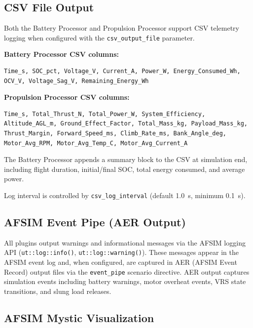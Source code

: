 \subsection{\unclass CSV File Output}

\unclass Both the Battery Processor and Propulsion Processor support CSV telemetry logging when configured with the \texttt{csv\_output\_file} parameter.

\unclass \textbf{Battery Processor CSV columns:}
\begin{codebox}
\begin{lstlisting}[language={},mathescape=false]
Time_s, SOC_pct, Voltage_V, Current_A, Power_W, Energy_Consumed_Wh,
OCV_V, Voltage_Sag_V, Remaining_Energy_Wh
\end{lstlisting}
\end{codebox}

\unclass \textbf{Propulsion Processor CSV columns:}
\begin{codebox}
\begin{lstlisting}[language={},mathescape=false]
Time_s, Total_Thrust_N, Total_Power_W, System_Efficiency,
Altitude_AGL_m, Ground_Effect_Factor, Total_Mass_kg, Payload_Mass_kg,
Thrust_Margin, Forward_Speed_ms, Climb_Rate_ms, Bank_Angle_deg,
Motor_Avg_RPM, Motor_Avg_Temp_C, Motor_Avg_Current_A
\end{lstlisting}
\end{codebox}

\unclass The Battery Processor appends a summary block to the CSV at simulation end, including flight duration, initial/final SOC, total energy consumed, and average power.

\unclass Log interval is controlled by \texttt{csv\_log\_interval} (default 1.0~s, minimum 0.1~s).

\subsection{\unclass AFSIM Event Pipe (AER Output)}

\unclass All plugins output warnings and informational messages via the AFSIM logging API (\texttt{ut::log::info()}, \texttt{ut::log::warning()}). These messages appear in the AFSIM event log and, when configured, are captured in AER (AFSIM Event Record) output files via the \texttt{event\_pipe} scenario directive. AER output captures simulation events including battery warnings, motor overheat events, VRS state transitions, and slung load releases.

\subsection{\unclass AFSIM Mystic Visualization}

